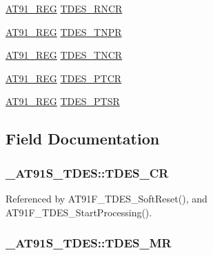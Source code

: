\begin{CompactItemize}
\item 
\hyperlink{AT91SAM7X256_8h_712ad5a1ac1bd02f3e95a7526c283ce1}{AT91\_\-REG} \hyperlink{struct__AT91S__TDES_a7ff7820c4d592f49487a837eb1671f4}{TDES\_\-RNCR}
\item 
\hyperlink{AT91SAM7X256_8h_712ad5a1ac1bd02f3e95a7526c283ce1}{AT91\_\-REG} \hyperlink{struct__AT91S__TDES_c258435da3438bb7eed9fb0032ccf135}{TDES\_\-TNPR}
\item 
\hyperlink{AT91SAM7X256_8h_712ad5a1ac1bd02f3e95a7526c283ce1}{AT91\_\-REG} \hyperlink{struct__AT91S__TDES_af8553eda9742f8c89053ad88bccc477}{TDES\_\-TNCR}
\item 
\hyperlink{AT91SAM7X256_8h_712ad5a1ac1bd02f3e95a7526c283ce1}{AT91\_\-REG} \hyperlink{struct__AT91S__TDES_d0db911eb6744ae5f818f57053632572}{TDES\_\-PTCR}
\item 
\hyperlink{AT91SAM7X256_8h_712ad5a1ac1bd02f3e95a7526c283ce1}{AT91\_\-REG} \hyperlink{struct__AT91S__TDES_22ad54204fae8aeefbdcb643c87967b4}{TDES\_\-PTSR}
\end{CompactItemize}


\subsection{Field Documentation}
\hypertarget{struct__AT91S__TDES_7b48f8c1a3bf999c41c0081813b4a75b}{
\subsubsection{ {\bf \_\-AT91S\_\-TDES::TDES\_\-CR}}}
\label{struct__AT91S__TDES_7b48f8c1a3bf999c41c0081813b4a75b}




Referenced by AT91F\_\-TDES\_\-SoftReset(), and AT91F\_\-TDES\_\-StartProcessing().\hypertarget{struct__AT91S__TDES_8962dd4d8dd09c236b10c035683fe22f}{
\subsubsection{ {\bf \_\-AT91S\_\-TDES::TDES\_\-MR}}}
\label{struct__AT91S__TDES_8962dd4d8dd09c236b10c035683fe22f}




